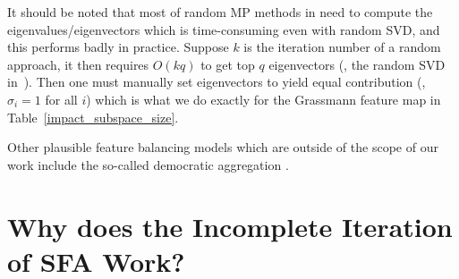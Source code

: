 \begin{table}[h]
      \centering
      \caption{\label{impact_subspace_size}Impact of subspace size $\kappa$ in Grassman feature map without the noise injection (Cora).}
\end{table}

It should be noted that most of random MP methods in  need to compute the eigenvalues/eigenvectors which is time-consuming even with random SVD, and this performs badly in practice.  Suppose $k$ is the iteration number of a random approach, it then requires $O(kq)$ to get top $q$ eigenvectors (\eg, the random SVD in~). Then one must manually set eigenvectors to yield equal contribution (\ie, $\sigma_i=1$ for all $i$) which is what we do exactly for the Grassmann feature map in Table~\ref{impact_subspace_size}.
   

%


Other plausible feature balancing models which are outside of the scope of our work include the so-called democratic aggregation .

\section{Why does the Incomplete Iteration of SFA Work?~\label{sec:why_it_works}}

